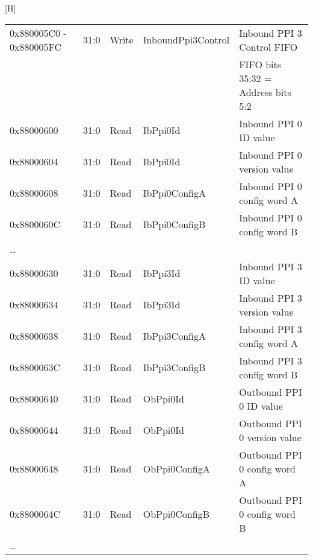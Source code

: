 \documentclass[11pt]{article}
\begin{document}
\begin{center}[H]
\begin{longtable}{| l | l | l | l | l | }
      \hline 0x880005C0 - 0x880005FC & 31:0  & Write & InboundPpi3Control   & Inbound PPI 3 Control FIFO                     \\
                                     &       &       &                      & FIFO bits 35:32 = Address bits 5:2             \\
      \hline 0x88000600              & 31:0  & Read  & IbPpi0Id             & Inbound PPI 0 ID value                         \\
      \hline 0x88000604              & 31:0  & Read  & IbPpi0Id             & Inbound PPI 0 version value                      \\
      \hline 0x88000608              & 31:0  & Read  & IbPpi0ConfigA        & Inbound PPI 0 config word A              \\
      \hline 0x8800060C              & 31:0  & Read  & IbPpi0ConfigB        & Inbound PPI 0 config word B              \\
             \ldots                  &       &       &                      &                                                \\
      \hline 0x88000630              & 31:0  & Read  & IbPpi3Id             & Inbound PPI 3 ID value                         \\
      \hline 0x88000634              & 31:0  & Read  & IbPpi3Id             & Inbound PPI 3 version value                      \\
      \hline 0x88000638              & 31:0  & Read  & IbPpi3ConfigA        & Inbound PPI 3 config word A              \\
      \hline 0x8800063C              & 31:0  & Read  & IbPpi3ConfigB        & Inbound PPI 3 config word B              \\
      \hline 0x88000640              & 31:0  & Read  & ObPpi0Id             & Outbound PPI 0 ID value                         \\
      \hline 0x88000644              & 31:0  & Read  & ObPpi0Id             & Outbound PPI 0 version value                      \\
      \hline 0x88000648              & 31:0  & Read  & ObPpi0ConfigA        & Outbound PPI 0 config word A              \\
      \hline 0x8800064C              & 31:0  & Read  & ObPpi0ConfigB        & Outbound PPI 0 config word B              \\
             \ldots                  &       &       &                      &                                                \\

\end{longtable}
\end{center}
\end{document}

